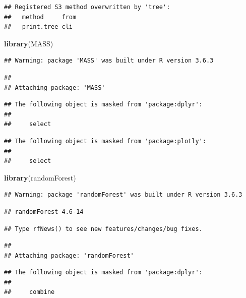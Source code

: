 \documentclass[
]{article}
\newenvironment{Shaded}{\begin{snugshade}}{\end{snugshade}}
\newcommand{\KeywordTok}[1]{\textcolor[rgb]{0.13,0.29,0.53}{\textbf{#1}}}
\newcommand{\NormalTok}[1]{#1}
\begin{document}
\begin{verbatim}
## Registered S3 method overwritten by 'tree':
##   method     from
##   print.tree cli
\end{verbatim}

\begin{Shaded}
\begin{Highlighting}[]
\KeywordTok{library}\NormalTok{(MASS)}
\end{Highlighting}
\end{Shaded}

\begin{verbatim}
## Warning: package 'MASS' was built under R version 3.6.3
\end{verbatim}

\begin{verbatim}
## 
## Attaching package: 'MASS'
\end{verbatim}

\begin{verbatim}
## The following object is masked from 'package:dplyr':
## 
##     select
\end{verbatim}

\begin{verbatim}
## The following object is masked from 'package:plotly':
## 
##     select
\end{verbatim}

\begin{Shaded}
\begin{Highlighting}[]
\KeywordTok{library}\NormalTok{(randomForest)}
\end{Highlighting}
\end{Shaded}

\begin{verbatim}
## Warning: package 'randomForest' was built under R version 3.6.3
\end{verbatim}

\begin{verbatim}
## randomForest 4.6-14
\end{verbatim}

\begin{verbatim}
## Type rfNews() to see new features/changes/bug fixes.
\end{verbatim}

\begin{verbatim}
## 
## Attaching package: 'randomForest'
\end{verbatim}

\begin{verbatim}
## The following object is masked from 'package:dplyr':
## 
##     combine
\end{verbatim}
\end{document}
